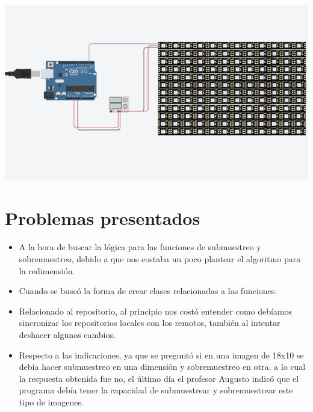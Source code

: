 \documentclass{article}
\begin{document}
\includegraphics{images/Circuito.png}

\section{Problemas presentados}
\begin{itemize}

\item A la hora de buscar la lógica para las funciones de submuestreo y sobremuestreo, debido a que nos costaba un poco plantear el algoritmo para la redimensión.

\item Cuando se buscó la forma de crear clases relacionadas a las funciones.

\item Relacionado al repositorio, al principio nos costó entender como debíamos sincronizar los repositorios locales con los remotos, también al intentar deshacer algunos cambios.

\item Respecto a las indicaciones, ya que se preguntó si en una imagen de 18x10 se debía hacer submuestreo en una dimensión y sobremuestreo en otra, a lo cual la respuesta obtenida fue no, el último día el profesor Augusto indicó que el programa debía tener la capacidad de submuestrear y sobremuestrear este tipo de imagenes.



\end{itemize}
\end{document}
